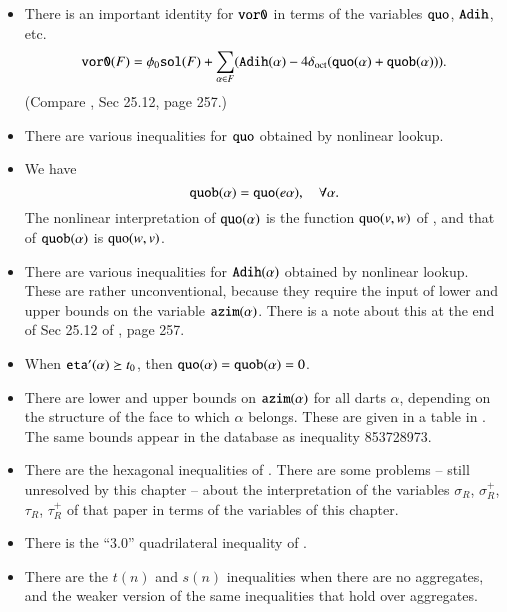 \begin{itemize}
    \item There is an important identity for ${\operatorname{{\texttt{vor0}}}}$ in terms of the
    variables ${\operatorname{{\texttt{quo}}}}$, ${\operatorname{{\texttt{Adih}}}}$, etc.
    \begin{equation}
    {\operatorname{{\texttt{vor0}}}}(F) = \phi_0 {\operatorname{{\texttt{sol}}}}(F) +\sum_{\alpha\in F}
    ({\operatorname{{\texttt{Adih}}}}(\alpha) - 4\delta_{\operatorname{oct}}({\operatorname{{\texttt{quo}}}}(\alpha)
    +{\operatorname{{\texttt{quob}}}}(\alpha))).
    \end{equation}
    (Compare \cite{DCG}, Sec 25.12, page 257.)
%
    \item There are various inequalities for ${\operatorname{{\texttt{quo}}}}$ obtained
    by nonlinear lookup.
%
    \item We have
        \begin{equation}
        {\operatorname{{\texttt{quob}}}}(\alpha) = {\operatorname{{\texttt{quo}}}}(e\alpha),\quad
        \forall\alpha.
        \end{equation}
    The nonlinear interpretation of ${\operatorname{{\texttt{quo}}}}(\alpha)$ is
    the function ${\operatorname{quo}}(v,w)$ of \cite{DCG}, and that of
    ${\operatorname{{\texttt{quob}}}}(\alpha)$ is ${\operatorname{quo}}(w,v)$.
%
    \item There are various inequalities for ${\operatorname{{\texttt{Adih}}}}(\alpha)$
    obtained by nonlinear lookup.  These are rather
    unconventional, because they require the input of lower and
    upper bounds on the variable ${\operatorname{{\texttt{azim}}}}(\alpha)$.  There is
    a note about this at the end of Sec 25.12 of \cite{DCG}, page 257.
%
    \item When ${\operatorname{{\texttt{eta}}}}'(\alpha)\succeq t_0$, then ${\operatorname{{\texttt{quo}}}}(\alpha)
    = {\operatorname{{\texttt{quob}}}}(\alpha)=0$.
    \item There are lower and upper bounds on ${\operatorname{{\texttt{azim}}}}(\alpha)$ for all
    darts $\alpha$, depending on the structure of the face to
    which $\alpha$ belongs.  These are given in a table in
    \cite[VI,p.54]{Hal98D}.  The same bounds appear in the database as
    inequality 853728973.
    \item There are the hexagonal inequalities of \cite[25.13]{DCG}.
  There are some problems -- still unresolved by this chapter --
  about the interpretation of the variables $\sigma_R$,
  $\sigma_R^+$, $\tau_R$, $\tau_R^+$ of that paper in terms of the variables
  of this chapter.
  \item There is the ``$3.0$'' quadrilateral inequality of
  \cite[Sec.25.10]{DCG}.
  \item There are the $t(n)$ and $s(n)$ inequalities when there
  are no aggregates, and the weaker version of the same
  inequalities that hold over aggregates.
\end{itemize}

